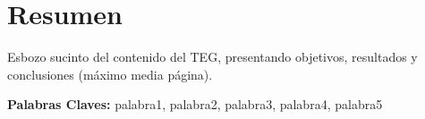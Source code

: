 \chapter*{Resumen}

Esbozo sucinto del contenido del TEG, presentando objetivos, resultados y conclusiones (m\'aximo media p\'agina).


\noindent \textbf{Palabras Claves:} palabra1, palabra2, palabra3, palabra4, palabra5